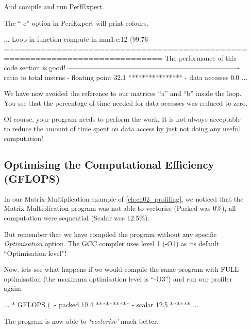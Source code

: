 And compile and run PerfExpert.

The ``-c'' option in PerfExpert will print colours.

\begin{prompt}
...
Loop in function compute in mm1.c:12 (99.76%
============================================================================
The performance of this code section is good!
----------------------------------------------------------------------------
ratio to total instrns    %
 - floating point       32.1 ****************
 - data accesses         0.0
...
\end{prompt}

We have now avoided the reference to our matrices ``a'' and ``b'' inside the loop. You see that the percentage of time needed for data accesses was reduced to zero.

 Of course, your program needs to perform the work. It is not always acceptable to reduce the amount of time spent on data access by just not doing any useful computation!

\subsection{Optimising the Computational Efficiency (GFLOPS)}
\label{subsec:Optimizing_Computational_Efficiancy}

In our Matrix-Multiplication example of \autoref{ch:ch02_profiling}, we noticed that the Matrix Multiplication program was not able to vectorise (Packed was 0\%), all computation were sequential (Scalar was 12.5\%).

But remember that we have compiled the program without any specific \textit{Optimisation} option. The GCC compiler uses level 1 (-O1) as its default ``Optimisation level''!

Now, lets see what happens if we would compile the same program with FULL optimisation (the maximum optimisation level is ``-O3'') and run our profiler again:

\begin{prompt}
...
* GFLOPS (%
.- packed               19.4 **********
 - scalar               12.5 ******
...
\end{prompt}

The program is now able to \textit{`vectorise'} much better.

